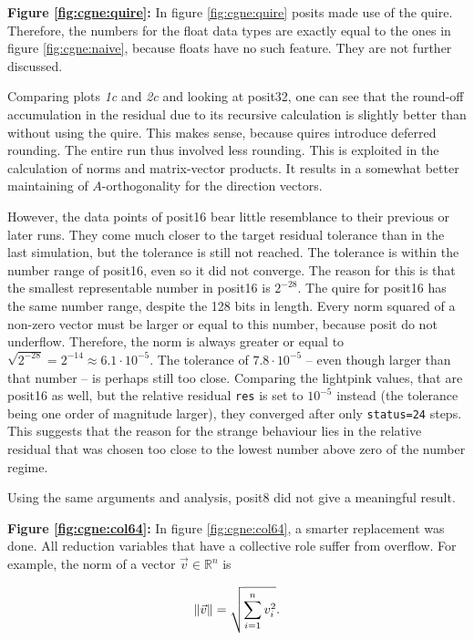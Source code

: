 \documentclass{article}
\theoremstyle{plain} %
\theoremstyle{convention} %
\theoremstyle{remark} %
\def\code#1{\texttt{#1}}
\numberwithin{equation}{section}
\begin{document}
\textbf{Figure \ref{fig:cgne:quire}:} In figure \ref{fig:cgne:quire} posits made use of the \gls{quire}. Therefore, the numbers for the float data types are exactly equal to the ones in figure \ref{fig:cgne:naive}, because floats have no such feature. They are not further discussed.

Comparing plots \textit{1c} and \textit{2c} and looking at \gls{posit32}, one can see that the round-off accumulation in the residual due to its recursive calculation is slightly better than without using the \gls{quire}. This makes sense, because \glspl{quire} introduce deferred rounding. The entire run thus involved less rounding. This is exploited in the calculation of norms and matrix-vector products. It results in a somewhat better maintaining of $A$-orthogonality for the direction vectors.

However, the data points of \gls{posit16} bear little resemblance to their previous or later runs. They come much closer to the target residual tolerance than in the last simulation, but the tolerance is still not reached. The tolerance is within the number range of \gls{posit16}, even so it did not converge. The reason for this is that the smallest representable number in \gls{posit16} is $2^{-28}$. The \gls{quire} for \gls{posit16} has the same number range, despite the \num{128} bits in length. Every norm squared of a non-zero vector must be larger or equal to this number, because posit do not underflow. Therefore, the norm is always greater or equal to $\sqrt{2^{-28}} = 2^{-14} \approx 6.1 \cdot 10^{-5}$. The tolerance of $7.8 \cdot 10^{-5}$ -- even though larger than that number -- is perhaps still too close. Comparing the \textcolor{clightpink}{lightpink} values, that are \gls{posit16} as well, but the relative residual \code{res} is set to $10^{-5}$ instead (the tolerance being one order of magnitude larger), they converged after only \code{status=24} steps. This suggests that the reason for the strange behaviour lies in the relative residual that was chosen too close to the lowest number above zero of the number regime.

Using the same arguments and analysis, \gls{posit8} did not give a meaningful result.

\textbf{Figure \ref{fig:cgne:col64}:} In figure \ref{fig:cgne:col64}, a smarter replacement was done. All reduction variables that have a collective role suffer from overflow. For example, the norm of a vector $\vec{v} \in \mathbb{R}^n$ is 

\begin{align*}
    \norm{\vec{v}} = \sqrt{ \sum_{i=1}^{n} v_i^2 }.
\end{align*}
\end{document}
